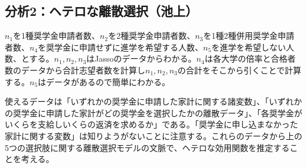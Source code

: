 \documentclass{jsarticle}
\begin{document}
	\subsection{分析2：ヘテロな離散選択（池上）}
	$n_1$を1種奨学金申請者数、$n_2$を2種奨学金申請者数、$n_3$を1種2種併用奨学金申請者数、$n_4$を奨学金に申請せずに進学を希望する人数、$n_5$を進学を希望しない人数、とする。$n_1, n_2, n_3$はJassoのデータからわかる。$n_4$は各大学の倍率と合格者数のデータから合計志望者数を計算し$n_1,n_2,n_3$の合計をそこから引くことで計算する。$n_5$はデータがあるので簡単にわかる。
	\par
	使えるデータは「いずれかの奨学金に申請した家計に関する諸変数」、「いずれかの奨学金に申請した家計がどの奨学金を選択したかの離散データ」、「各奨学金がいくらを支給しいくらの返済を求めるか」である。「奨学金に申し込まなかった家計に関する変数」は知りようがないことに注意する。これらのデータから上の5つの選択肢に関する離散選択モデルの文脈で、ヘテロな効用関数を推定することを考える。
	\par
\end{document}
